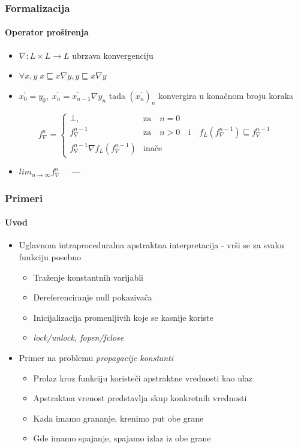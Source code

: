 \documentclass[xetex,mathserif,serif]{beamer}
\begin{document}
  \begin{frame}

    \frametitle{Formalizacija}
    \framesubtitle{Operator proširenja}
    \begin{center}
    	\begin{itemize}
    		\item $\nabla : L \times L \rightarrow L$ ubrzava konvergenciju \pause
    		\item $\forall x,\! y \; x \sqsubseteq x \nabla y, y \sqsubseteq x \nabla y$ \pause
    		\item $x^{\prime}_{0} = y_{0}, \; x^{\prime}_{n} = x^{\prime}_{n-1} \nabla y_{n}$ tada $(x^{\prime}_{n})_{n}$ konvergira u konačnom broju koraka \pause
    	\end{itemize}
    	$$
			f^{n}_{\nabla} = 
			\begin{cases}
			\bot,            								  
				& 	\text{za} \quad n = 0 \\
			f^{n-1}_{\nabla} 							      
				& \text{za} \quad n > 0 \quad \text{i} \quad f_{L}(f^{n-1}_{\nabla}) \sqsubseteq f^{n-1}_{\nabla} \\
			f^{n-1}_{\nabla} \nabla f_{L}(f^{n-1}_{\nabla})  
				& \text{inače}
			\end{cases}
		$$
		\pause
		\begin{itemize}
			\item $lim_{n \rightarrow \infty }f^{n}_{\nabla} \quad$ --- 
		\end{itemize}
	\end{center}
  \end{frame}
  \begin{frame}
    \frametitle{Primeri}
    \framesubtitle{Uvod}
    \begin{center}
		\begin{itemize}
			\item Uglavnom intraproceduralna apstraktna interpretacija - vr\v si se za svaku funkciju posebno
			\begin{itemize}
				\item Tra\v zenje konstantnih varijabli
				\item Dereferenciranje null pokaziva\v ca
				\item Inicijalizacija promenljivih koje se kasnije koriste
				\item \emph{lock/unlock, fopen/fclose}
			\end{itemize}
			\item Primer na problemu \emph{propagacije konstanti}
			\begin{itemize}
				\item Prolaz kroz funkciju koriste\v ci apstraktne vrednosti kao ulaz 
				\item Apstraktna vrenost predstavlja skup konkretnih vrednosti
				\item Kada imamo grananje, krenimo put obe grane
				\item Gde imamo spajanje, spajamo izlaz iz obe grane
			\end{itemize}
		\end{itemize}
	\end{center}
  \end{frame}
\end{document}
